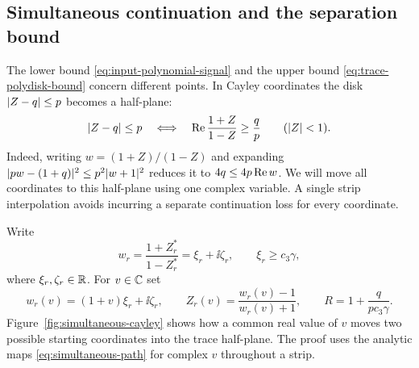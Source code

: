 \subsection{Simultaneous continuation and the separation bound}

The lower bound \eqref{eq:input-polynomial-signal} and the upper bound
\eqref{eq:trace-polydisk-bound} concern different points.  In Cayley
coordinates the disk $\lvert Z-q\rvert\le p$ becomes a half-plane:
\begin{equation}
 \lvert Z-q\rvert\le p
 \quad\Longleftrightarrow\quad
 \operatorname{Re}\frac{1+Z}{1-Z}\ge\frac qp
 \qquad(\lvert Z\rvert<1).
 \label{eq:cayley-trace-disk}
\end{equation}
Indeed, writing $w=(1+Z)/(1-Z)$ and expanding
$\lvert pw-(1+q)\rvert^2\le p^2\lvert w+1\rvert^2$ reduces it to
$4q\le4p\operatorname{Re} w$.  We will move all coordinates to this half-plane
using one complex variable.  A single strip interpolation avoids
incurring a separate continuation loss for every coordinate.

Write
\[
 w_r=\frac{1+Z_r^*}{1-Z_r^*}=\xi_r+\ii\zeta_r,
 \qquad \xi_r\ge c_3\gamma,
\]
where $\xi_r,\zeta_r\in\mathbb R$.  For $v\in\mathbb C$ set
\begin{equation}
 w_r(v)=(1+v)\xi_r+\ii\zeta_r,
 \qquad Z_r(v)=\frac{w_r(v)-1}{w_r(v)+1},
 \qquad
 R=1+\frac{q}{pc_3\gamma}.
 \label{eq:simultaneous-path}
\end{equation}
Figure~\ref{fig:simultaneous-cayley} shows how a common real value of
$v$ moves two possible starting coordinates into the trace half-plane.
The proof uses the analytic maps \eqref{eq:simultaneous-path} for complex
$v$ throughout a strip.

